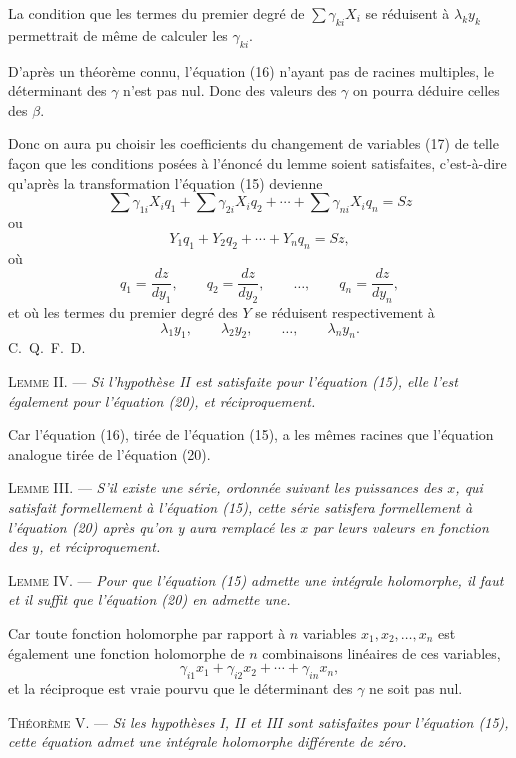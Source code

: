 \documentclass[11pt]{article}
\begin{document}
La condition que les termes du premier degré de $\sum\gamma_{ki}X_i$ se réduisent à $\lambda_ky_k$ permettrait de même de calculer les $\gamma_{ki}$.

D’après un théorème connu, l’équation (16) n’ayant pas de racines multiples, le déterminant des $\gamma$ n’est pas nul. Donc des valeurs des $\gamma$ on pourra déduire celles des $\beta$.

Donc on aura pu choisir les coefficients du changement de variables (17) de telle façon que les conditions posées à l’énoncé du lemme soient satisfaites, c’est-à-dire qu’après la transformation l’équation (15) devienne
\[
\sum\gamma_{1i}X_iq_1+\sum\gamma_{2i}X_iq_2+\cdots+\sum\gamma_{ni}X_iq_n=Sz
\]
ou
\begin{equation*}\tag{20}
Y_1q_1+Y_2q_2+\cdots+Y_nq_n=Sz,
\end{equation*}
où
\[
q_1=\frac{dz}{dy_1},\qquad q_2=\frac{dz}{dy_2},\qquad \ldots,\qquad q_n=\frac{dz}{dy_n},
\]
et où les termes du premier degré des $Y$ se réduisent respectivement à
\[
\lambda_1y_1,
\qquad \lambda_2y_2,
\qquad \ldots,
\qquad \lambda_ny_n.
\]
\hfill\mbox{C. Q. F. D.}

\noindent\textsc{Lemme II.} --- \emph{Si l’hypothèse II est satisfaite pour l’équation (15), elle l’est également pour l’équation (20), et réciproquement.}

Car l’équation (16), tirée de l’équation (15), a les mêmes racines que l’équation analogue tirée de l’équation (20).

\noindent\textsc{Lemme III.} --- \emph{S’il existe une série, ordonnée suivant les puissances des $x$, qui satisfait formellement à l’équation (15), cette série satisfera formellement à l’équation (20) après qu’on y aura remplacé les $x$ par leurs valeurs en fonction des $y$, et réciproquement.}

\noindent\textsc{Lemme IV.} --- \emph{Pour que l’équation (15) admette une intégrale holomorphe, il faut et il suffit que l’équation (20) en admette une.}

Car toute fonction holomorphe par rapport à $n$ variables $x_1,x_2,\ldots,x_n$ est également une fonction holomorphe de $n$ combinaisons linéaires de ces variables,
\[
\gamma_{i1}x_1+\gamma_{i2}x_2+\cdots+\gamma_{in}x_n,
\]
et la réciproque est vraie pourvu que le déterminant des $\gamma$ ne soit pas nul.

\noindent\textsc{Théorème V.} --- \emph{Si les hypothèses I, II et III sont satisfaites pour l’équation (15), cette équation admet une intégrale holomorphe différente de zéro.}
\end{document}
